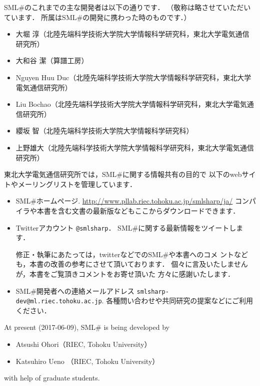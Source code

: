 \documentclass{jbook}
\newcommand{\smlsharp}{SML\#}
\newcommand{\releaseDate}{2017-06-09}
\begin{document}
	\smlsharp{}のこれまでの主な開発者は以下の通りです．
	（敬称は略させていただいています．
	所属は\smlsharp{}の開発に携わった時のものです．）
\begin{itemize}
\item 大堀 淳（北陸先端科学技術大学院大学情報科学研究科，東北大学電気通信研究所）
\item 大和谷 潔（算譜工房）
\item Nguyen Huu Duc（北陸先端科学技術大学院大学情報科学研究科，東北大学電気通信研究所）
\item Liu Bochao（北陸先端科学技術大学院大学情報科学研究科，東北大学電気通信研究所）
\item 纓坂 智（北陸先端科学技術大学院大学情報科学研究科）
\item 上野雄大（北陸先端科学技術大学院大学情報科学研究科，東北大学電気通信研究所）
\end{itemize}

	東北大学電気通信研究所では，\smlsharp{}に関する情報共有の目的で
以下のwebサイトやメーリングリストを管理しています．
\begin{itemize}
\item \smlsharp{}ホームページ.
\url{http://www.pllab.riec.tohoku.ac.jp/smlsharp/ja/}
コンパイラや本書を含む文書の最新版などもここからダウンロードできます．

\item Twitterアカウント {\tt @smlsharp}．
\smlsharp{}に関する最新情報をツイートします．

	修正・執筆にあたっては，twitterなどでの\smlsharp{}や本書へのコメ
ントなども，本書の改善の参考にさせて頂いております．
	個々に言及いたしませんが，本書をご覧頂きコメントをお寄せ頂いた
方々に感謝いたします． 

\item \smlsharp{}開発者への連絡メールアドレス
{\tt smlsharp-dev@ml.riec.tohoku.ac.jp}.
各種問い合わせや共同研究の提案などにご利用ください．

\end{itemize}
\else%
	At present (\releaseDate), \smlsharp{} is being developed by
\begin{itemize}
\item 
Atsushi Ohori（RIEC, Tohoku University）
\item 
Katsuhiro Ueno （RIEC, Tohoku University）
\end{itemize}
with help of graduate students.
\end{document}
